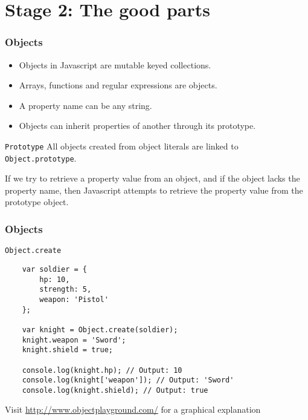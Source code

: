 \section{Stage 2: The good parts}

\begin{frame}[fragile]
\end{frame}

\begin{frame}[fragile]
  \frametitle{Objects}
  \begin{itemize}
    \item Objects in Javascript are mutable keyed collections.
    \pause\item Arrays, functions and regular expressions are objects.
    \pause\item A property name can be any string.
    \pause\item Objects can inherit properties of another through its prototype.
  \end{itemize}

  \pause

  \begin{block}{\texttt{Prototype}}
    All objects created from object literals are linked to \texttt{Object.prototype}.
    \pause

    If we try to retrieve a property value from an object, and if the object lacks the property name, then Javascript attempts to retrieve the property value from the prototype object.
  \end{block}
\end{frame}

\begin{frame}[fragile]
  \frametitle{Objects}
  \begin{block}{\texttt{Object.create}}
    {\scriptsize
    \begin{verbatim}
    var soldier = {
        hp: 10,
        strength: 5,
        weapon: 'Pistol'
    };

    var knight = Object.create(soldier);
    knight.weapon = 'Sword';
    knight.shield = true;

    console.log(knight.hp); // Output: 10
    console.log(knight['weapon']); // Output: 'Sword'
    console.log(knight.shield); // Output: true
    \end{verbatim}
    }
  \end{block}

  Visit \url{http://www.objectplayground.com/} for a graphical explanation
\end{frame}

